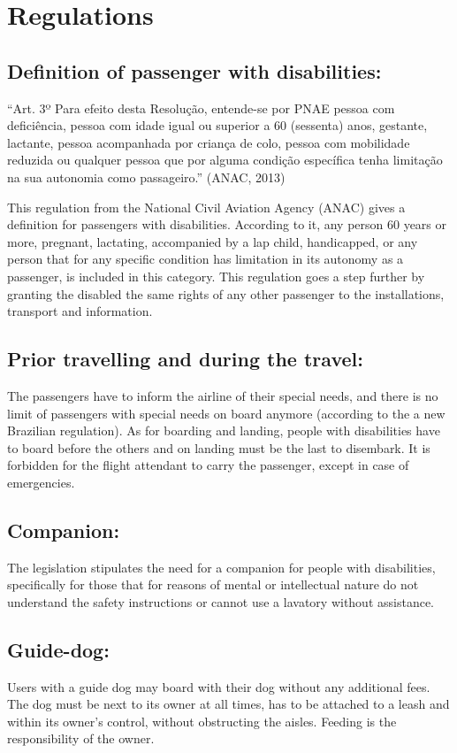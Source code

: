 \section*{Regulations}
\subsection{Definition of passenger with disabilities:}
“Art. 3º Para efeito desta Resolução, entende-se por PNAE pessoa com deficiência, pessoa com idade igual ou superior a 60 (sessenta) anos, gestante, lactante, pessoa acompanhada por criança de colo, pessoa com mobilidade reduzida ou qualquer pessoa que por alguma condição específica tenha limitação na sua autonomia como passageiro.” (ANAC, 2013)

This regulation from the National Civil Aviation Agency (ANAC) gives a definition for passengers with disabilities. According to it, any person 60 years or more, pregnant, lactating, accompanied by a lap child, handicapped, or any person that for any specific condition has limitation in its autonomy as a passenger, is included in this category.   This regulation goes a step further by granting the disabled the same rights of any other passenger to the installations, transport and information.

\subsection{Prior travelling and during the travel:}
The passengers have to inform the airline of their special needs, and there is no limit of passengers with special needs on board anymore (according to the a new Brazilian regulation). As for boarding and landing, people with disabilities have to board before the others and on landing must be the last to disembark. It is forbidden for the flight attendant to carry the passenger, except in case of emergencies.

\subsection{Companion:}
The legislation stipulates the need for a companion for people with disabilities, specifically for those that for reasons of mental or intellectual nature do not understand the safety instructions or cannot use a lavatory without assistance.

\subsection{Guide-dog:}
Users with a guide dog may board with their dog without any additional fees. The dog must be next to its owner at all times, has to be attached to a leash and within its owner’s control, without obstructing the aisles. Feeding is the responsibility of the owner.

